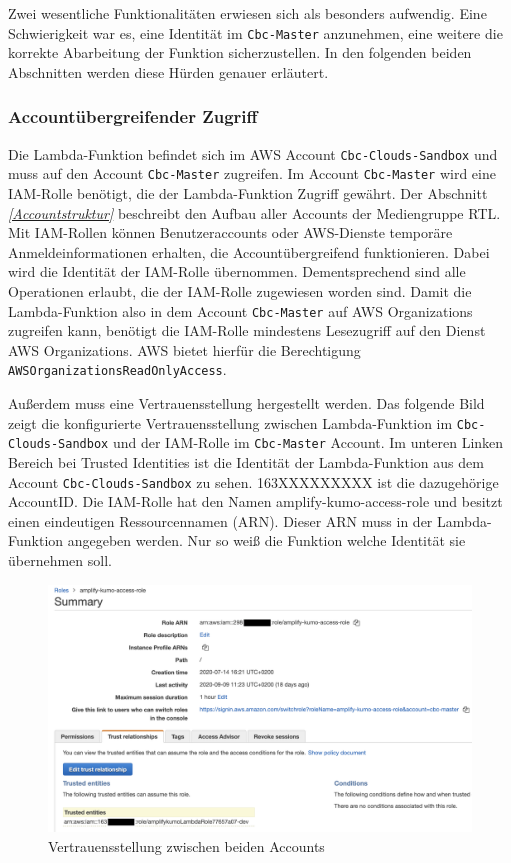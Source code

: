 Zwei wesentliche Funktionalitäten erwiesen sich als besonders aufwendig.
Eine Schwierigkeit war es, eine Identität im \verb+Cbc-Master+ anzunehmen, eine weitere die korrekte Abarbeitung der Funktion sicherzustellen.
In den folgenden beiden Abschnitten werden diese Hürden genauer erläutert.
\clearpage
\subsubsection{Accountübergreifender Zugriff}
\label{AccountübergreifenderZugriff}
Die Lambda-Funktion befindet sich im AWS Account \verb+Cbc-Clouds-Sandbox+ und muss auf den Account \verb+Cbc-Master+ zugreifen.
Im Account \verb+Cbc-Master+ wird eine IAM-Rolle benötigt, die der Lambda-Funktion Zugriff gewährt.
Der Abschnitt  \textit{\ref{Accountstruktur} } beschreibt den Aufbau aller Accounts der Mediengruppe RTL.
Mit IAM-Rollen können Benutzeraccounts oder AWS-Dienste temporäre Anmeldeinformationen erhalten, die Accountübergreifend funktionieren.
Dabei wird die Identität der IAM-Rolle übernommen.
Dementsprechend sind alle Operationen erlaubt, die der IAM-Rolle zugewiesen worden sind.
Damit die Lambda-Funktion also in dem Account \verb+Cbc-Master+ auf AWS Organizations zugreifen kann, benötigt die IAM-Rolle mindestens Lesezugriff auf den Dienst AWS Organizations.
AWS bietet hierfür die Berechtigung \verb+AWSOrganizationsReadOnlyAccess+.

Außerdem muss eine Vertrauensstellung hergestellt werden.
Das folgende Bild zeigt die konfigurierte Vertrauensstellung zwischen Lambda-Funktion im \verb+Cbc-Clouds-Sandbox+ und der IAM-Rolle im \verb+Cbc-Master+ Account.
Im unteren Linken Bereich bei \glqq Trusted Identities\grqq{} ist die Identität der Lambda-Funktion aus dem Account \verb+Cbc-Clouds-Sandbox+ zu sehen.
163XXXXXXXXX ist die dazugehörige AccountID.
Die IAM-Rolle hat den Namen \grqq amplify-kumo-access-role\grqq{} und besitzt einen eindeutigen Ressourcennamen (ARN).
Dieser ARN muss in der Lambda-Funktion angegeben werden. Nur so weiß die Funktion welche Identität sie übernehmen soll.


\begin{figure}[htbp]
    \centering
    \includegraphics[width=1.0\textwidth]{50-Implementierung/IAM-Rolle.png}
    \caption{Vertrauensstellung zwischen beiden Accounts}
    \label{fig:meine-grafik}
\end{figure}

